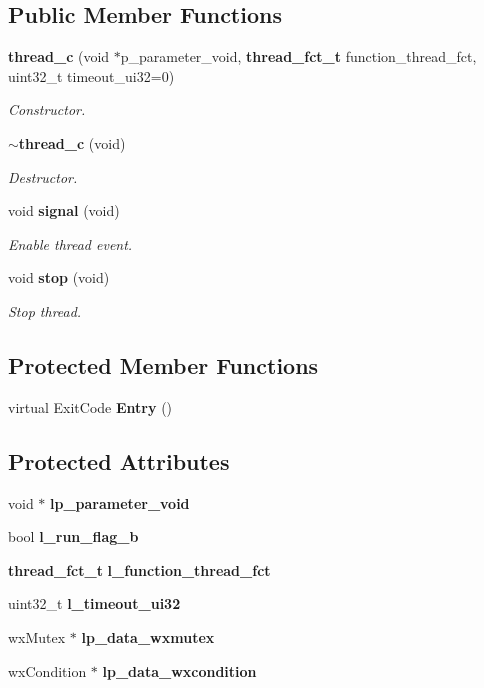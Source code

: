 \subsection*{Public Member Functions}
\begin{DoxyCompactItemize}
\item 
\textbf{ thread\+\_\+c} (void $\ast$p\+\_\+parameter\+\_\+void, \textbf{ thread\+\_\+fct\+\_\+t} function\+\_\+thread\+\_\+fct, uint32\+\_\+t timeout\+\_\+ui32=0)
\begin{DoxyCompactList}\small\item\em Constructor. \end{DoxyCompactList}\item 
\textbf{ $\sim$thread\+\_\+c} (void)
\begin{DoxyCompactList}\small\item\em Destructor. \end{DoxyCompactList}\item 
void \textbf{ signal} (void)
\begin{DoxyCompactList}\small\item\em Enable thread event. \end{DoxyCompactList}\item 
void \textbf{ stop} (void)
\begin{DoxyCompactList}\small\item\em Stop thread. \end{DoxyCompactList}\end{DoxyCompactItemize}
\subsection*{Protected Member Functions}
\begin{DoxyCompactItemize}
\item 
virtual Exit\+Code \textbf{ Entry} ()
\end{DoxyCompactItemize}
\subsection*{Protected Attributes}
\begin{DoxyCompactItemize}
\item 
\mbox{\label{classthread__c_ab4ba6f74dab1080d8d12837a39ca0400}} 
void $\ast$ {\bfseries lp\+\_\+parameter\+\_\+void}
\item 
\mbox{\label{classthread__c_a333250e027831d46656f560c27c2f901}} 
bool {\bfseries l\+\_\+run\+\_\+flag\+\_\+b}
\item 
\mbox{\label{classthread__c_a0fdf3f6d35bf3fc07f8765db69eeb849}} 
\textbf{ thread\+\_\+fct\+\_\+t} {\bfseries l\+\_\+function\+\_\+thread\+\_\+fct}
\item 
\mbox{\label{classthread__c_a1fae32a44df6efabed8016983ad91f17}} 
uint32\+\_\+t {\bfseries l\+\_\+timeout\+\_\+ui32}
\item 
\mbox{\label{classthread__c_a3a96d3e6b969bc9577fbfe39b2d700c3}} 
wx\+Mutex $\ast$ {\bfseries lp\+\_\+data\+\_\+wxmutex}
\item 
\mbox{\label{classthread__c_a257314930759c7d1cf8b8d473cde595d}} 
wx\+Condition $\ast$ {\bfseries lp\+\_\+data\+\_\+wxcondition}
\end{DoxyCompactItemize}


